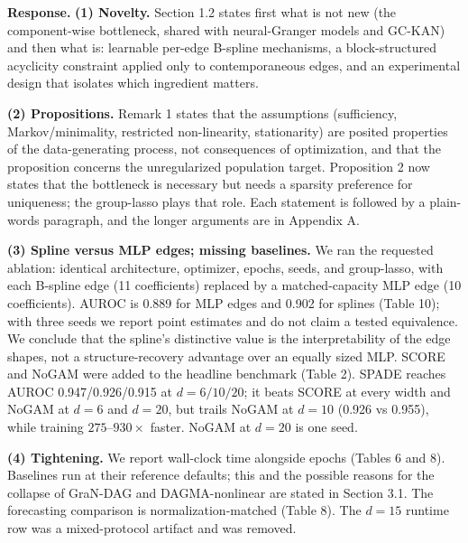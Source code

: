\documentclass[11pt]{article}
\begin{document}
\textbf{Response.} \textbf{(1) Novelty.} Section 1.2 states first what is not new (the component-wise bottleneck, shared with neural-Granger models and GC-KAN) and then what is: learnable per-edge B-spline mechanisms, a block-structured acyclicity constraint applied only to contemporaneous edges, and an experimental design that isolates which ingredient matters.

\textbf{(2) Propositions.} Remark 1 states that the assumptions (sufficiency, Markov/minimality, restricted non-linearity, stationarity) are posited properties of the data-generating process, not consequences of optimization, and that the proposition concerns the unregularized population target. Proposition 2 now states that the bottleneck is necessary but needs a sparsity preference for uniqueness; the group-lasso plays that role. Each statement is followed by a plain-words paragraph, and the longer arguments are in Appendix A.

\textbf{(3) Spline versus MLP edges; missing baselines.} We ran the requested ablation: identical architecture, optimizer, epochs, seeds, and group-lasso, with each B-spline edge (11 coefficients) replaced by a matched-capacity MLP edge (10 coefficients). AUROC is 0.889 for MLP edges and 0.902 for splines (Table 10); with three seeds we report point estimates and do not claim a tested equivalence. We conclude that the spline's distinctive value is the interpretability of the edge shapes, not a structure-recovery advantage over an equally sized MLP. SCORE and NoGAM were added to the headline benchmark (Table 2). SPADE reaches AUROC 0.947/0.926/0.915 at $d = 6/10/20$; it beats SCORE at every width and NoGAM at $d = 6$ and $d = 20$, but trails NoGAM at $d = 10$ (0.926 vs 0.955), while training $275$--$930\times$ faster. NoGAM at $d = 20$ is one seed.

\textbf{(4) Tightening.} We report wall-clock time alongside epochs (Tables 6 and 8). Baselines run at their reference defaults; this and the possible reasons for the collapse of GraN-DAG and DAGMA-nonlinear are stated in Section 3.1. The forecasting comparison is normalization-matched (Table 8). The $d = 15$ runtime row was a mixed-protocol artifact and was removed.
\end{document}
